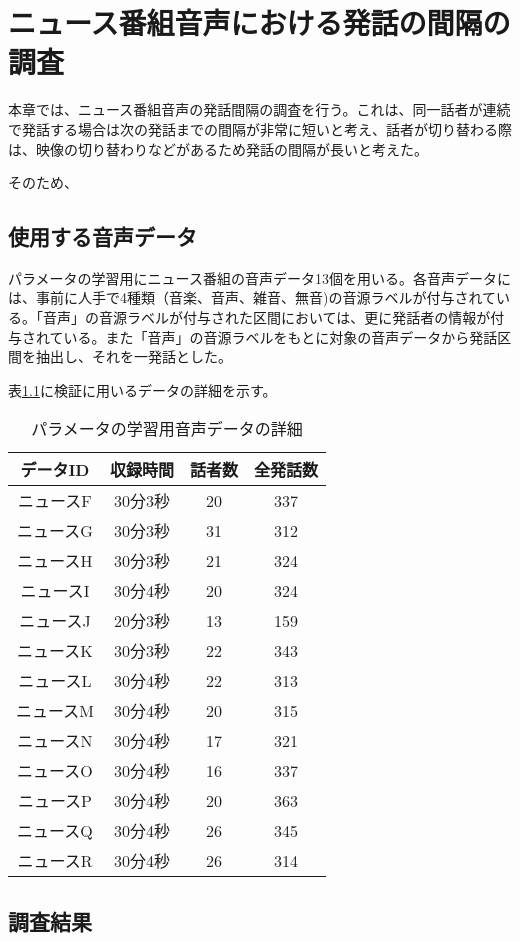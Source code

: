 \chapter{ニュース番組音声における発話の間隔の調査}
本章では、ニュース番組音声の発話間隔の調査を行う。これは、同一話者が連続で発話する場合は次の発話までの間隔が非常に短いと考え、話者が切り替わる際は、映像の切り替わりなどがあるため発話の間隔が長いと考えた。\par
そのため、

\section{使用する音声データ}
パラメータの学習用にニュース番組の音声データ13個を用いる。各音声データには、事前に人手で4種類（音楽、音声、雑音、無音)の音源ラベルが付与されている。「音声」の音源ラベルが付与された区間においては、更に発話者の情報が付与されている。また「音声」の音源ラベルをもとに対象の音声データから発話区間を抽出し、それを一発話とした。\par
表\ref{table:train_detail}に検証に用いるデータの詳細を示す。\vspace{0.2in}

\begin{table}[htb]
  \begin{center}
  \label{table:train_detail}
    \caption{パラメータの学習用音声データの詳細}
    \begin{tabular}{|c||c|c|c|} \hline
      データID & 収録時間 & 話者数 & 全発話数 \\ \hline
      ニュースF & 30分3秒 & 20 & 337 \\ \hline
      ニュースG & 30分3秒 & 31 & 312\\ \hline
      ニュースH & 30分3秒 & 21 & 324 \\ \hline
      ニュースI & 30分4秒 & 20 & 324\\ \hline
      ニュースJ & 20分3秒 & 13 & 159\\ \hline
      ニュースK & 30分3秒 & 22 & 343\\ \hline
      ニュースL & 30分4秒 & 22 & 313\\ \hline
      ニュースM & 30分4秒 & 20 & 315\\ \hline
      ニュースN & 30分4秒 & 17 & 321\\ \hline
      ニュースO & 30分4秒 & 16 & 337\\ \hline
      ニュースP & 30分4秒 & 20 & 363\\ \hline
      ニュースQ & 30分4秒 & 26 & 345\\ \hline
      ニュースR & 30分4秒 & 26 & 314\\ \hline
    \end{tabular}
  \end{center}
\end{table}
\section{調査結果}